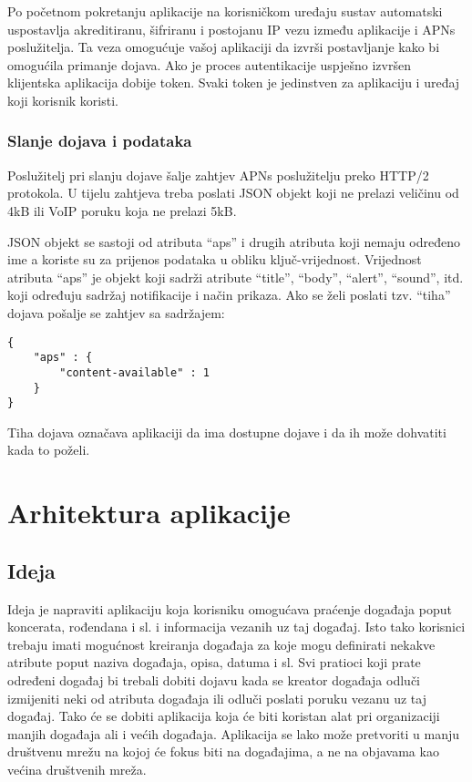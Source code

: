 \documentclass[times, utf8, zavrsni]{fer}
\begin{document}
Po početnom pokretanju aplikacije na korisničkom uređaju sustav automatski uspostavlja akreditiranu, šifriranu i postojanu IP vezu između aplikacije i APNs poslužitelja. Ta veza omogućuje vašoj aplikaciji da izvrši postavljanje kako bi omogućila primanje dojava. Ako je proces autentikacije uspješno izvršen klijentska aplikacija dobije token. Svaki token je jedinstven za aplikaciju i uređaj koji korisnik koristi.

\subsection{Slanje dojava i podataka}

Poslužitelj pri slanju dojave šalje zahtjev APNs poslužitelju preko HTTP/2 protokola. U tijelu zahtjeva treba poslati JSON objekt koji ne prelazi veličinu od 4kB ili 	VoIP poruku koja ne prelazi 5kB.

JSON objekt se sastoji od atributa ``aps'' i drugih atributa koji nemaju određeno ime a koriste su za prijenos podataka u obliku ključ-vrijednost. Vrijednost atributa ``aps'' je objekt koji sadrži atribute ``title'', ``body'', ``alert'', ``sound'', itd. koji određuju sadržaj notifikacije i način prikaza. Ako se želi poslati tzv. ``tiha'' dojava pošalje se zahtjev sa sadržajem:

\begin{lstlisting}
{
    "aps" : {
        "content-available" : 1
    }
}
\end{lstlisting}

Tiha dojava označava aplikaciji da ima dostupne dojave i da ih može dohvatiti kada to poželi.

\chapter{Arhitektura aplikacije}

\section{Ideja}
Ideja je napraviti aplikaciju koja korisniku omogućava praćenje događaja poput koncerata, rođendana i sl. i informacija vezanih uz taj događaj. Isto tako korisnici trebaju imati mogućnost kreiranja događaja za koje mogu definirati nekakve atribute poput naziva događaja, opisa, datuma i sl. Svi pratioci koji prate određeni događaj bi trebali dobiti dojavu kada se kreator događaja odluči izmijeniti neki od atributa događaja ili odluči poslati poruku vezanu uz taj događaj. Tako će se dobiti aplikacija koja će biti koristan alat pri organizaciji manjih događaja ali i većih događaja. Aplikacija se lako može pretvoriti u manju društvenu mrežu na kojoj će fokus biti na događajima, a ne na objavama kao većina društvenih mreža.
\end{document}
